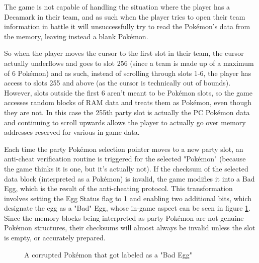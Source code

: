 \documentclass[a4paper]{usiinfbachelorproject}
\begin{document}
The game is not capable of handling the situation where the player has a Decamark in their team, and as such when the player tries to open their team information in battle it will unsuccessfully try to read the Pokémon's data from the memory, leaving instead a blank Pokémon.

So when the player moves the cursor to the first slot in their team, the cursor actually underflows and goes to slot 256 (since a team is made up of a maximum of 6 Pokémon) and as such, instead of scrolling through slots 1-6, the player has access to slots 255 and above (as the cursor is technically out of bounds). However, slots outside the first 6 aren't meant to be Pokémon slots, so the game accesses random blocks of RAM data and treats them as Pokémon, even though they are not. In this case the 255th party slot is actually the PC Pokémon data and continuing to scroll upwards allows the player to actually go over memory addresses reserved for various in-game data.

Each time the party Pokémon selection pointer moves to a new party slot, an anti-cheat verification routine is triggered for the selected "Pokémon" (because the game thinks it is one, but it's actually not). If the checksum of the selected data block (interpreted as a Pokémon) is invalid, the game modifies it into a Bad Egg, which is the result of the anti-cheating protocol. This transformation involves setting the Egg Status flag to 1 and enabling two additional bits, which designate the egg as a "Bad" Egg, whose in-game aspect can be seen in figure \ref{fig:bad_egg}. Since the memory blocks being interpreted as party Pokémon are not genuine Pokémon structures, their checksums will almost always be invalid unless the slot is empty, or accurately prepared.

\begin{figure}[h!]
	\caption{A corrupted Pokémon that got labeled as a "Bad Egg"}\label{fig:bad_egg}
\end{figure}
\end{document}

